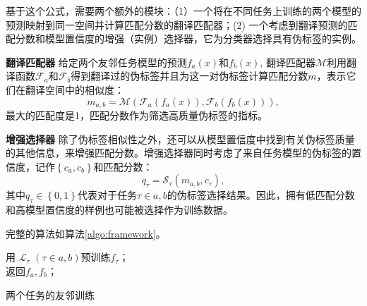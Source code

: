 基于这个公式，需要两个额外的模块：（1）一个将在不同任务上训练的两个模型的预测映射到同一空间并计算匹配分数的翻译匹配器；(2) 一个考虑到翻译预测的匹配分数和模型置信度的增强（实例）选择器，它为分类器选择具有伪标签的实例。

\noindent\textbf{翻译匹配器 } 给定两个友邻任务模型的预测$f_a(x)$和$f_b(x)$, 翻译匹配器$\mathcal{M}$利用翻译函数$\mathcal{F}_a$和$\mathcal{F}_b$得到翻译过的伪标签并且为这一对伪标签计算匹配分数$m$，表示它们在翻译空间中的相似度：
\begin{equation}\label{eq:matcher}
    m_{a,b}=\mathcal{M}\left(\mathcal{F}_a(f_a(x)),\mathcal{F}_b(f_b(x))\right),
\end{equation}
最大的匹配度是1，匹配分数作为筛选高质量伪标签的指标。

\noindent\textbf{增强选择器 } 除了伪标签相似性之外，还可以从模型置信度中找到有关伪标签质量的其他信息，来增强匹配分数。增强选择器同时考虑了来自任务模型的伪标签的置信度，记作$\left\{c_a,c_b \right\}$和匹配分数：
\begin{equation}\label{eq:selector}
    q_\tau = \mathcal{S}_\tau(m_{a,b}, c_\tau),
\end{equation}
其中$q_\tau \in \left\{0, 1\right\}$代表对于任务$\tau \in {a,b}$的伪标签选择结果。因此，拥有低匹配分数和高模型置信度的样例也可能被选择作为训练数据。

完整的算法如算法\ref{algo:framework}。

\begin{algorithm}[t]
    
    用 $\mathcal{L}_\tau$ $\left(\tau \in a,b\right)$预训练$f_\tau$；\\
    返回$f_a,f_b$；
    \caption{两个任务的友邻训练}\label{algo:framework}
\end{algorithm}

